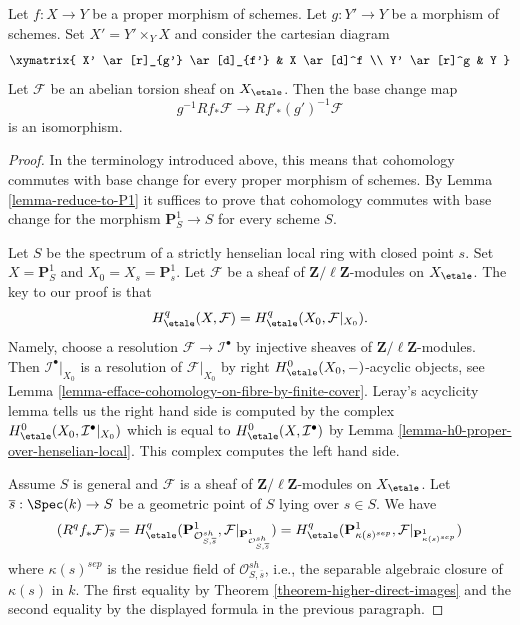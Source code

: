 \begin{theorem}
\label{theorem-proper-base-change}
Let $f : X \to Y$ be a proper morphism of schemes. Let $g : Y' \to Y$ be
a morphism of schemes. Set $X' = Y' \times_Y X$
and consider the cartesian diagram
$$
\xymatrix{
X' \ar[r]_{g'} \ar[d]_{f'} & X \ar[d]^f \\
Y' \ar[r]^g & Y
}
$$
Let $\mathcal{F}$ be an abelian torsion sheaf on $X_\etale$.
Then the base change map
$$
g^{-1}Rf_*\mathcal{F} \longrightarrow Rf'_*(g')^{-1}\mathcal{F}
$$
is an isomorphism.
\end{theorem}

\begin{proof}
In the terminology introduced above, this means that cohomology commutes
with base change for every proper morphism of schemes. By
Lemma \ref{lemma-reduce-to-P1}
it suffices to prove that cohomology commutes with base change
for the morphism $\mathbf{P}^1_S \to S$ for every scheme $S$.

\medskip\noindent
Let $S$ be the spectrum of a strictly henselian local ring with closed
point $s$. Set $X = \mathbf{P}^1_S$ and $X_0 = X_s = \mathbf{P}^1_s$.
Let $\mathcal{F}$ be a sheaf of $\mathbf{Z}/\ell\mathbf{Z}$-modules
on $X_\etale$. The key to our proof is that
$$
H^q_\etale(X, \mathcal{F}) = H^q_\etale(X_0, \mathcal{F}|_{X_0}).
$$
Namely, choose a resolution $\mathcal{F} \to \mathcal{I}^\bullet$
by injective sheaves of $\mathbf{Z}/\ell\mathbf{Z}$-modules.
Then $\mathcal{I}^\bullet|_{X_0}$ is a resolution of $\mathcal{F}|_{X_0}$
by right $H^0_\etale(X_0, -)$-acyclic objects, see
Lemma \ref{lemma-efface-cohomology-on-fibre-by-finite-cover}.
Leray's acyclicity lemma tells us the right hand side is computed by
the complex $H^0_\etale(X_0, \mathcal{I}^\bullet|_{X_0})$
which is equal to $H^0_\etale(X, \mathcal{I}^\bullet)$ by
Lemma \ref{lemma-h0-proper-over-henselian-local}. This complex
computes the left hand side.

\medskip\noindent
Assume $S$ is general and $\mathcal{F}$ is a sheaf of
$\mathbf{Z}/\ell\mathbf{Z}$-modules on $X_\etale$.
Let $\overline{s} : \Spec(k) \to S$ be a geometric point
of $S$ lying over $s \in S$. We have
$$
(R^qf_*\mathcal{F})_{\overline{s}} =
H^q_\etale(\mathbf{P}^1_{\mathcal{O}_{S, \overline{s}}^{sh}},
\mathcal{F}|_{\mathbf{P}^1_{\mathcal{O}_{S, \overline{s}}^{sh}}}) =
H^q_\etale(\mathbf{P}^1_{\kappa(s)^{sep}},
\mathcal{F}|_{\mathbf{P}^1_{\kappa(s)^{sep}}})
$$
where $\kappa(s)^{sep}$ is the residue field of
$\mathcal{O}_{S, \overline{s}}^{sh}$, i.e., the separable algebraic
closure of $\kappa(s)$ in $k$.
The first equality by Theorem \ref{theorem-higher-direct-images}
and the second equality by the displayed formula in the
previous paragraph.


\end{proof}
